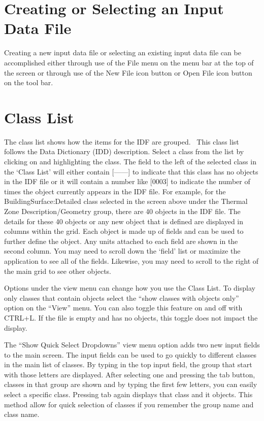 \section{Creating or Selecting an Input Data File}\label{creating-or-selecting-an-input-data-file}

Creating a new input data file or selecting an existing input data file can be accomplished either through use of the File menu on the menu bar at the top of the screen or through use of the New File icon button or Open File icon button on the tool bar.

\section{Class List}\label{class-list}

The class list shows how the items for the IDF are grouped.~ This class list follows the Data Dictionary (IDD) description. Select a class from the list by clicking on and highlighting the class. The field to the left of the selected class in the `Class List' will either contain {[}------{]} to indicate that this class has no objects in the IDF file or it will contain a number like {[}0003{]} to indicate the number of times the object currently appears in the IDF file. For example, for the BuildingSurface:Detailed class selected in the screen above under the Thermal Zone Description/Geometry group, there are 40 objects in the IDF file. The details for these 40 objects or any new object that is defined are displayed in columns within the grid. Each object is made up of fields and can be used to further define the object. Any units attached to each field are shown in the second column. You may need to scroll down the `field' list or maximize the application to see all of the fields. Likewise, you may need to scroll to the right of the main grid to see other objects.

Options under the view menu can change how you use the Class List. To display only classes that contain objects select the ``show classes with objects only'' option on the ``View'' menu. You can also toggle this feature on and off with CTRL+L. If the file is empty and has no objects, this toggle does not impact the display.

The ``Show Quick Select Dropdowns'' view menu option adds two new input fields to the main screen. The input fields can be used to go quickly to different classes in the main list of classes. By typing in the top input field, the group that start with those letters are displayed. After selecting one and pressing the tab button, classes in that group are shown and by typing the first few letters, you can easily select a specific class. Pressing tab again displays that class and it objects. This method allow for quick selection of classes if you remember the group name and class name.

